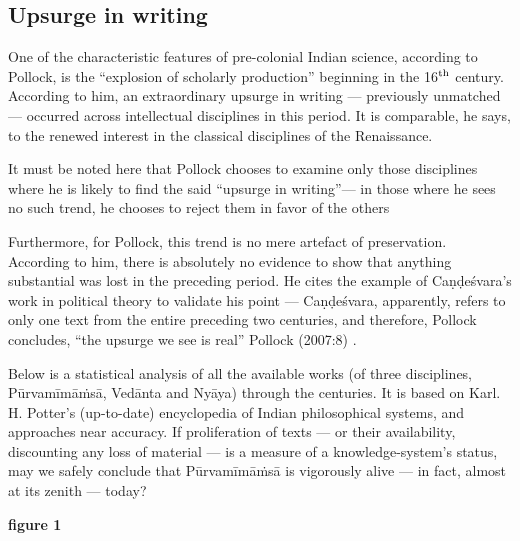 \subsection{Upsurge in writing}%
One of the characteristic features of pre-colonial Indian science, according to Pollock, is the “explosion of scholarly production” beginning in the 16$^{\rm th}$ century. According to him, an extraordinary upsurge in writing — previously unmatched — occurred across intellectual disciplines in this period. It is comparable, he says, to the renewed interest in the classical disciplines of the Renaissance. 

It must be noted here that Pollock chooses to examine only those disciplines where he is likely to find the said “upsurge in writing”— in those where he sees no such trend, he chooses to reject them in favor of the others
\begin{myquote}
Furthermore, for Pollock, this trend is no mere artefact of preservation. According to him, there is absolutely no evidence to show that anything substantial was lost in the preceding period. He cites the example of Caṇḍeśvara’s work in political theory to validate his point — Caṇḍeśvara, apparently, refers to only one text from the entire preceding two centuries, and therefore, Pollock concludes, “the upsurge we see is real” Pollock (2007:8) .
\end{myquote}

Below is a statistical analysis of all the available works (of three disciplines, Pūrvamīmāṁsā, Vedānta and Nyāya) through the centuries. It is based on Karl. H. Potter’s (up-to-date) encyclopedia of Indian philosophical systems, and approaches near accuracy. If proliferation of texts — or their availability, discounting any loss of material — is a measure of a knowledge-system’s status, may we safely conclude that Pūrvamīmāṁsā is vigorously alive — in fact, almost at its zenith — today?   
\begin{center}
{\bf figure 1}
\end{center}

